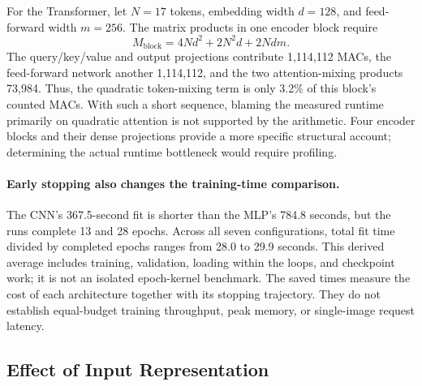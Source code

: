 \begin{table}[H]
    \centering
    \caption{Analytical MAC counts per image from configured layer dimensions. One MAC denotes one multiplication accumulated into a sum. Counts include dense/convolutional products, LSTM gate matrix products, and Transformer attention products; they exclude biases, nonlinearities, normalization, pooling, softmax, and data movement. These are operation estimates, not measured hardware FLOPs or latency.}
    \label{tab:a1-arithmetic-cost}
    \small
    
\end{table}

For the Transformer, let $N=17$ tokens, embedding width $d=128$, and feed-forward width $m=256$. The matrix products in one encoder block require
\begin{equation}
    M_{\mathrm{block}}=4Nd^2+2N^2d+2Ndm.
\end{equation}
The query/key/value and output projections contribute 1,114,112 MACs, the feed-forward network another 1,114,112, and the two attention-mixing products 73,984. Thus, the quadratic token-mixing term is only 3.2\% of this block's counted MACs. With such a short sequence, blaming the measured runtime primarily on quadratic attention is not supported by the arithmetic. Four encoder blocks and their dense projections provide a more specific structural account; determining the actual runtime bottleneck would require profiling.

\paragraph{Early stopping also changes the training-time comparison.}
The CNN's 367.5-second fit is shorter than the MLP's 784.8 seconds, but the runs complete 13 and 28 epochs. Across all seven configurations, total fit time divided by completed epochs ranges from 28.0 to 29.9 seconds. This derived average includes training, validation, loading within the loops, and checkpoint work; it is not an isolated epoch-kernel benchmark. The saved times measure the cost of each architecture together with its stopping trajectory. They do not establish equal-budget training throughput, peak memory, or single-image request latency.

\subsection{Effect of Input Representation}

